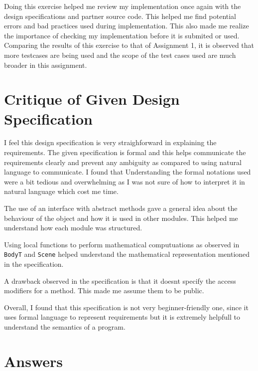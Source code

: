 \documentclass[12pt]{article}
\begin{document}
Doing this exercise helped me review my implementation once again with the design specifications and partner source code. This helped me find potential errors and  bad practices used during implementation. This also made me realize the importance of checking my implementation before it is submited or used. Comparing the results of this exercise to that of Assignment 1, it is observed that more testcases are being used and the scope of the test cases used are much broader in this assignment.

\section{Critique of Given Design Specification}
I feel this design specification is very straighforward in explaining the requirements. The given specification is formal and this helps communicate the requirements clearly and prevent any ambiguity as compared to using natural language to communicate. I found that Understanding the formal notations used were a bit tedious and overwhelming as I was not sure of how to interpret it in natural language which cost me time. 

The use of an interface with abstract methods gave a general idea about the behaviour of the object and how it is used in other modules. This helped me understand how each module was structured.

Using local functions to perform mathematical computuations as observed in \verb|BodyT| and \verb|Scene| helped understand the mathematical representation mentioned in the specification.

A drawback observed in the specification is that it doesnt specify the access modifiers for a method. This made me assume them to be public.

Overall, I found that this specification is not very beginner-friendly one, since it uses formal language to represent requirements but it is extremely helpfull to understand the semantics of a program.

\section{Answers}
\end{document}
